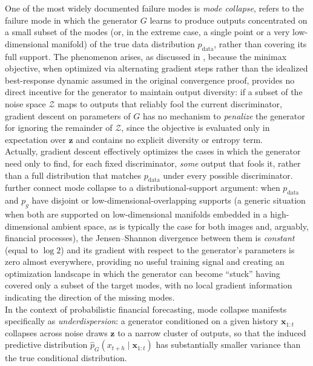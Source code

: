 One of the most widely documented failure modes is \emph{mode collapse}, 
refers to the failure mode in which the generator $G$ learns to produce outputs concentrated on a small subset of the modes
(or, in the extreme case, a single point or a very low-dimensional manifold) of the true data distribution
$p_{\mathrm{data}}$,
rather than covering its full support.
The phenomenon arises, as discussed in \cite{background:mode_collapse}, because the minimax objective, when optimized via alternating gradient steps
rather than the idealized best-response dynamic assumed in the original convergence proof,
provides no direct incentive for the generator to maintain output diversity:
if a subset of the noise space $\mathcal{Z}$ maps to outputs that reliably fool the current discriminator,
gradient descent on parameters of $G$ has no mechanism to \emph{penalize} 
the generator for ignoring the remainder of $\mathcal{Z}$, since the objective is evaluated only in expectation over $\mathbf{z}$ and contains no explicit diversity or entropy term.\\
Actually, gradient descent effectively optimizes the cases in which the generator 
need only to find, for each fixed discriminator, \emph{some} output that fools it, rather than a full distribution that matches $p_{\mathrm{data}}$
under every possible discriminator. 
\cite{background:wgan} further connect mode collapse to a distributional-support argument:
when $p_{\mathrm{data}}$ and $p_g$ have disjoint or low-dimensional-overlapping supports
(a generic situation when both are supported on low-dimensional manifolds embedded in a high-dimensional ambient space, as is typically the case for both images and, arguably, financial processes),
the Jensen--Shannon divergence between them is \emph{constant} (equal to $\log 2$)
and its gradient with respect to the generator's parameters is zero almost everywhere, 
providing no useful training signal and creating an optimization landscape in which the generator can become ``stuck'' 
having covered only a subset of the target modes, 
with no local gradient information indicating the direction of the missing modes.\\
In the context of probabilistic financial forecasting, 
mode collapse manifests specifically as \emph{underdispersion}: 
a generator conditioned on a given history $\mathbf{x}_{1:t}$ 
collapses across noise draws $\mathbf{z}$ 
to a narrow cluster of outputs, so that the induced 
predictive distribution $\hat p_G(x_{t+h} \mid \mathbf{x}_{1:t})$ 
has substantially smaller variance than the true conditional distribution.\\

